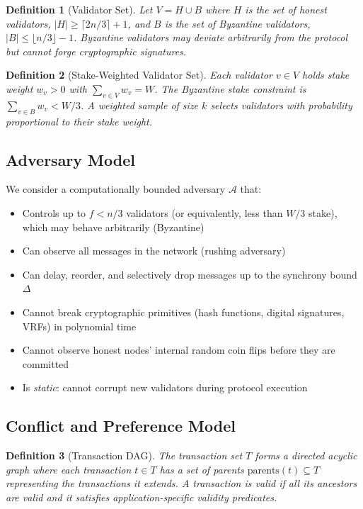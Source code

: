 \documentclass[11pt,a4paper]{article}
\newtheorem{definition}{Definition}[section]
\begin{document}
\begin{definition}[Validator Set]
Let $V = H \cup B$ where $H$ is the set of honest validators, $|H| \geq \lceil 2n/3 \rceil + 1$,
and $B$ is the set of Byzantine validators, $|B| \leq \lfloor n/3 \rfloor - 1$. Byzantine
validators may deviate arbitrarily from the protocol but cannot forge cryptographic signatures.
\end{definition}

\begin{definition}[Stake-Weighted Validator Set]
Each validator $v \in V$ holds stake weight $w_v > 0$ with $\sum_{v \in V} w_v = W$.
The Byzantine stake constraint is $\sum_{v \in B} w_v < W/3$.
A \emph{weighted sample} of size $k$ selects validators with probability proportional
to their stake weight.
\end{definition}

\subsection{Adversary Model}

We consider a computationally bounded adversary $\mathcal{A}$ that:
\begin{itemize}
\item Controls up to $f < n/3$ validators (or equivalently, less than $W/3$ stake),
which may behave arbitrarily (Byzantine)
\item Can observe all messages in the network (rushing adversary)
\item Can delay, reorder, and selectively drop messages up to the synchrony bound $\Delta$
\item Cannot break cryptographic primitives (hash functions, digital signatures, VRFs) in
polynomial time
\item Cannot observe honest nodes' internal random coin flips before they are committed
\item Is \emph{static}: cannot corrupt new validators during protocol execution
\end{itemize}

\subsection{Conflict and Preference Model}

\begin{definition}[Transaction DAG]
The transaction set $T$ forms a directed acyclic graph where each transaction $t \in T$
has a set of parents $\text{parents}(t) \subseteq T$ representing the transactions it
extends. A transaction is \emph{valid} if all its ancestors are valid and it satisfies
application-specific validity predicates.
\end{definition}
\end{document}
